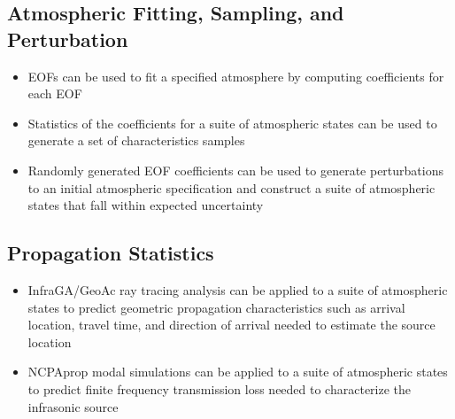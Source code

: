 \documentclass[letterpaper,10pt,english]{sphinxmanual}
\begin{document}
\subsection{Atmospheric Fitting, Sampling, and Perturbation}
\label{\detokenize{analysis:sampling}}\begin{itemize}
\item {} 
EOFs can be used to fit a specified atmosphere by computing coefficients for each EOF

\item {} 
Statistics of the coefficients for a suite of atmospheric states can be used to generate a set of characteristics samples

\item {} 
Randomly generated EOF coefficients can be used to generate perturbations to an initial atmospheric specification and construct a suite of atmospheric states that fall within expected uncertainty

\end{itemize}


\subsection{Propagation Statistics}
\label{\detokenize{analysis:propagation}}\begin{itemize}
\item {} 
InfraGA/GeoAc ray tracing analysis can be applied to a suite of atmospheric states to predict geometric propagation characteristics such as arrival location, travel time, and direction of arrival needed to estimate the source location

\item {} 
NCPAprop modal simulations can be applied to a suite of atmospheric states to predict finite frequency transmission loss needed to characterize the infrasonic source

\end{itemize}
\end{document}
